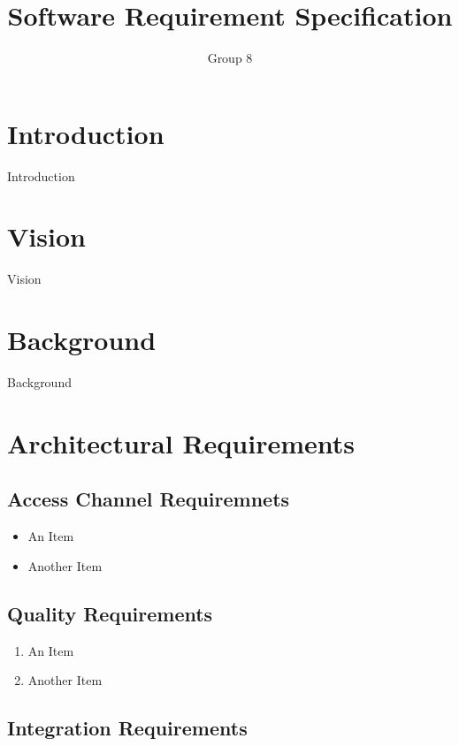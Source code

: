\documentclass[a4paper]{article}
\begin{document}
\title{\Huge{Software Requirement Specification}}
\author{Group 8}
\maketitle

\section{Introduction}

Introduction

\section{Vision}

Vision

\section{Background}

Background

\section{Architectural Requirements}

\subsection{Access Channel Requiremnets}

\begin{itemize}

\item{An Item}

\item{Another Item}

\end{itemize}

\subsection{Quality Requirements}

\begin{enumerate}

\item{An Item}

\item{Another Item}

\end{enumerate}

\subsection{Integration Requirements}
\end{document}
